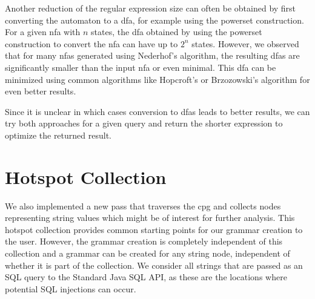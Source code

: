 Another reduction of the regular expression size can often be obtained by first converting the automaton to a \ac{dfa}, for example using the powerset construction. For a given \ac{nfa} with $n$ states, the \ac{dfa} obtained by using the powerset construction to convert the \ac{nfa} can have up to $2^n$ states. However, we observed that for many \acp{nfa} generated using Nederhof's algorithm, the resulting \acp{dfa} are significantly smaller than the input \ac{nfa} or even minimal. This \ac{dfa} can be minimized using common algorithms like Hopcroft's or Brzozowski's algorithm for even better results.

Since it is unclear in which cases conversion to \acp{dfa} leads to better results, we can try both approaches for a given query and return the shorter expression to optimize the returned result.


\section{Hotspot Collection} 
We also implemented a new pass that traverses the \ac{cpg} and collects nodes representing string values which might be of interest for further analysis. 
This hotspot collection provides common starting points for our grammar creation to the user. However, the grammar creation is completely independent of this collection and a grammar can be created for any string node, independent of whether it is part of the collection.
We consider all strings that are passed as an SQL query to the Standard Java SQL API, as these are the locations where potential SQL injections can occur.
